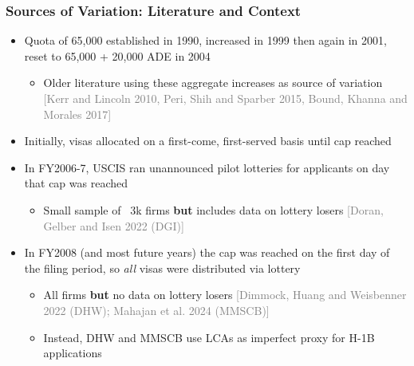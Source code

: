 \documentclass[xcolor=dvipsnames, compress, 12pt, aspectratio=169, handout]{beamer}
\begin{document}
\begin{frame}
    \frametitle{Sources of Variation: Literature and Context}
    \begin{itemize}
        \item Quota of 65,000 established in 1990, increased in 1999 then again in 2001, reset to 65,000 + 20,000 ADE in 2004
        \begin{itemize}
            \item Older literature using these aggregate increases as source of variation \textcolor{gray}{\footnotesize [Kerr and Lincoln 2010, Peri, Shih and Sparber 2015, Bound, Khanna and Morales 2017]}
        \end{itemize}
        \item Initially, visas allocated on a first-come, first-served basis until cap reached 
        \item In FY2006-7, USCIS ran unannounced pilot lotteries for applicants on day that cap was reached
        \begin{itemize}
            \item Small sample of ~3k firms \textbf{but} includes data on lottery losers \textcolor{gray}{\footnotesize [Doran, Gelber and Isen 2022 (DGI)]}
        \end{itemize}
        \item In FY2008 (and most future years) the cap was reached on the first day of the filing period, so \textit{all} visas were distributed via lottery
        \begin{itemize}
                \item All firms \textbf{but} no data on lottery losers \textcolor{gray}{\footnotesize [Dimmock, Huang and Weisbenner 2022 (DHW); Mahajan et al. 2024 (MMSCB)]}
                \item Instead, DHW and MMSCB use LCAs as imperfect proxy for H-1B applications
        \end{itemize}
    \end{itemize}
\end{frame}
\end{document}
